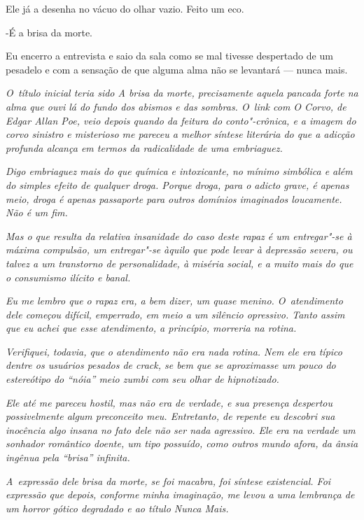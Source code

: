 Ele já a desenha no vácuo do olhar vazio. Feito um eco.

-É a brisa da morte.

Eu encerro a entrevista e saio da sala como se mal tivesse despertado de
um pesadelo e com a sensação de que alguma alma não se levantará ---
nunca mais.~

\begin{center}\asterisc{}\end{center}


\emph{O~título inicial teria sido A brisa da morte, precisamente aquela
pancada forte na alma que ouvi lá do fundo dos abismos e das sombras. O~link com O Corvo, de Edgar Allan Poe, veio depois quando da feitura do
conto"-crônica, e a imagem do corvo sinistro e misterioso me pareceu a
melhor síntese literária do que a adicção profunda alcança em termos da
radicalidade de uma embriaguez.}~

\emph{Digo embriaguez mais do que química e intoxicante, no mínimo
simbólica e além do simples efeito de qualquer droga. Porque droga, para
o adicto grave, é apenas meio, droga é apenas passaporte para outros
domínios imaginados loucamente. Não é um fim.}~

\emph{Mas o que resulta da relativa insanidade do caso deste rapaz é um
entregar"-se à máxima compulsão, um entregar"-se àquilo que pode levar à
depressão severa, ou talvez a um transtorno de personalidade, à miséria
social, e a muito mais do que o consumismo ilícito e banal.}~

\emph{Eu me lembro que o rapaz era, a bem dizer, um quase menino. O~atendimento dele começou difícil, emperrado, em meio a um silêncio
opressivo. Tanto assim que eu achei que esse atendimento, a princípio,
morreria na rotina.}~

\emph{Verifiquei, todavia, que o atendimento não era nada rotina. Nem
ele era típico dentre os usuários pesados de crack, se bem que se
aproximasse um pouco do estereótipo do ``nóia'' meio zumbi com seu olhar
de hipnotizado.}~

\emph{Ele até me pareceu hostil, mas não era de verdade, e sua presença
despertou possivelmente algum preconceito meu. Entretanto, de repente eu
descobri sua inocência algo insana no fato dele não ser nada agressivo.
Ele era na verdade um sonhador romântico doente, um tipo possuído, como
outros mundo afora, da ânsia ingênua pela ``brisa'' infinita.}~

\emph{A~expressão dele brisa da morte, se foi macabra, foi síntese
existencial. Foi expressão que depois, conforme minha imaginação, me
levou a uma lembrança de um horror gótico degradado e ao título Nunca
Mais.}~

